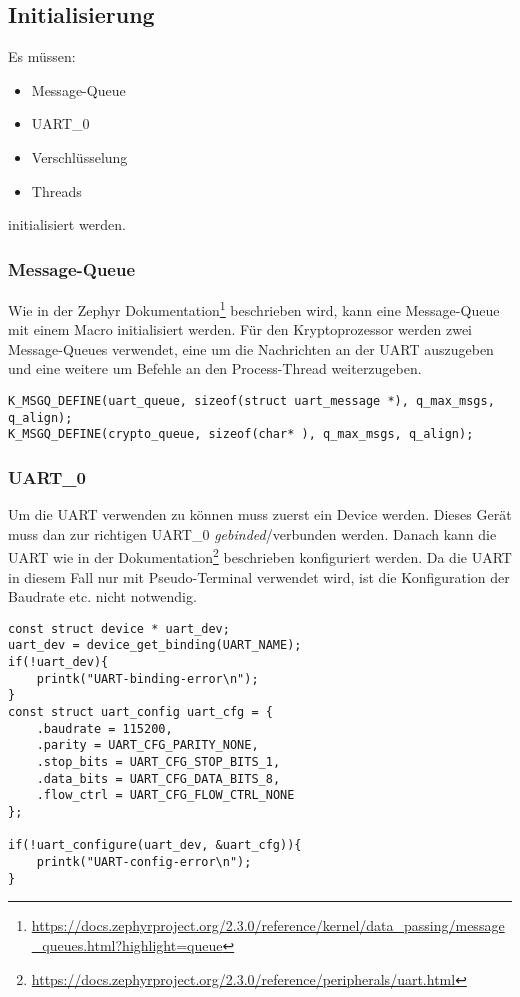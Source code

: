\subsection{Initialisierung}
Es müssen:
\begin{itemize}
    \item Message-Queue 
    \item UART\_0 
    \item Verschlüsselung 
    \item Threads
\end{itemize}
initialisiert werden. 
    \subsubsection{Message-Queue}
        Wie in der Zephyr Dokumentation\footnote{\url{https://docs.zephyrproject.org/2.3.0/reference/kernel/data_passing/message_queues.html?highlight=queue}} beschrieben wird, kann eine 
        Message-Queue mit einem Macro initialisiert werden. 
        Für den Kryptoprozessor werden zwei Message-Queues verwendet, eine um die Nachrichten an der UART auszugeben und eine weitere um Befehle an den Process-Thread weiterzugeben. 
        \begin{lstlisting}[style=StyleC, captionpos=b, caption=Message-Queue-Initialisierung, label=Message-Queue-Initialisierung]
K_MSGQ_DEFINE(uart_queue, sizeof(struct uart_message *), q_max_msgs, q_align);
K_MSGQ_DEFINE(crypto_queue, sizeof(char* ), q_max_msgs, q_align);
        \end{lstlisting}



    \subsubsection{UART\_0}
    Um die UART verwenden zu können muss zuerst ein Device  werden. Dieses Gerät muss dan zur richtigen UART\_0 \textit{gebinded}/verbunden werden. 
    Danach kann die UART wie in der Dokumentation\footnote{\url{https://docs.zephyrproject.org/2.3.0/reference/peripherals/uart.html}} beschrieben konfiguriert werden. Da die UART in diesem Fall nur mit Pseudo-Terminal verwendet wird, ist die Konfiguration der Baudrate etc. nicht notwendig. 
    \begin{lstlisting}[style=StyleC, captionpos=b, caption=UART-Initialisierung, label=UART-Initialisierung]
const struct device * uart_dev; 
uart_dev = device_get_binding(UART_NAME);
if(!uart_dev){
    printk("UART-binding-error\n");
}
const struct uart_config uart_cfg = {
    .baudrate = 115200,
    .parity = UART_CFG_PARITY_NONE,
    .stop_bits = UART_CFG_STOP_BITS_1,
    .data_bits = UART_CFG_DATA_BITS_8,
    .flow_ctrl = UART_CFG_FLOW_CTRL_NONE
};

if(!uart_configure(uart_dev, &uart_cfg)){
    printk("UART-config-error\n");
}
        \end{lstlisting}

